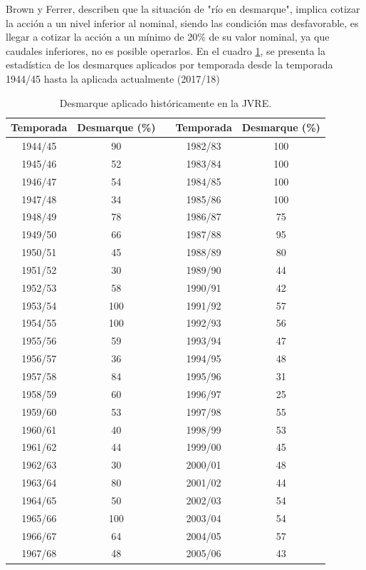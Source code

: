 \documentclass[11pt,]{article}
\begin{document}
	Brown y Ferrer, describen que la situación de "río en desmarque", implica cotizar la acción a un nivel inferior al nominal, siendo las condición mas desfavorable, es llegar a cotizar la acción a un mínimo de 20\% de su valor nominal, ya que caudales inferiores, no es posible operarlos. En el cuadro \ref{tabla2}, se presenta la estadística de los desmarques aplicados por temporada desde la temporada 1944/45 hasta la aplicada actualmente (2017/18) \bigskip

\begin{table}[H]
\centering
\caption{Desmarque aplicado históricamente en la JVRE.}
\label{tabla2}
\begin{tabular}{@{}ccccc@{}}
\toprule
\textbf{Temporada} & \textbf{Desmarque (\%)} & \textbf{} & \textbf{Temporada} & \textbf{Desmarque (\%)} \\ \midrule
1944/45 & 90 &  & 1982/83 & 100 \\
1945/46 & 52 &  & 1983/84 & 100 \\
1946/47 & 54 &  & 1984/85 & 100 \\
1947/48 & 34 &  & 1985/86 & 100 \\
1948/49 & 78 &  & 1986/87 & 75 \\
1949/50 & 66 &  & 1987/88 & 95 \\
1950/51 & 45 &  & 1988/89 & 80 \\
1951/52 & 30 &  & 1989/90 & 44 \\
1952/53 & 58 &  & 1990/91 & 42 \\
1953/54 & 100 &  & 1991/92 & 57 \\
1954/55 & 100 &  & 1992/93 & 56 \\
1955/56 & 59 &  & 1993/94 & 47 \\
1956/57 & 36 &  & 1994/95 & 48 \\
1957/58 & 84 &  & 1995/96 & 31 \\
1958/59 & 60 &  & 1996/97 & 25 \\
1959/60 & 53 &  & 1997/98 & 55 \\
1960/61 & 40 &  & 1998/99 & 53 \\
1961/62 & 44 &  & 1999/00 & 45 \\
1962/63 & 30 &  & 2000/01 & 48 \\
1963/64 & 80 &  & 2001/02 & 44 \\
1964/65 & 50 &  & 2002/03 & 54 \\
1965/66 & 100 &  & 2003/04 & 54 \\
1966/67 & 64 &  & 2004/05 & 57 \\
1967/68 & 48 &  & 2005/06 & 43 \\

\end{tabular}
\end{table}
\end{document}
